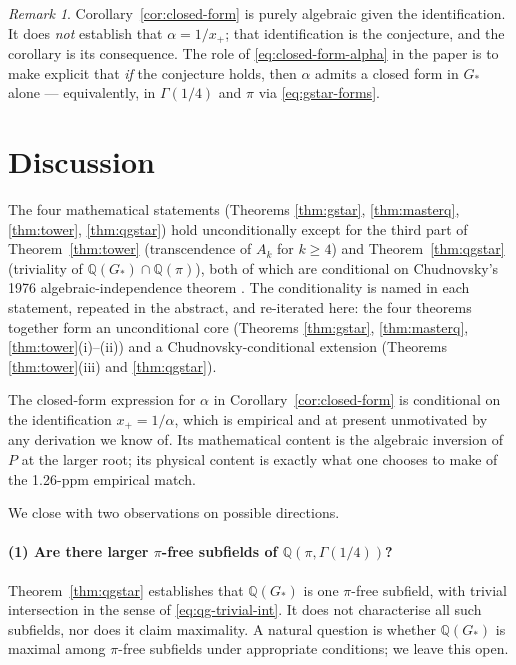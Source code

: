 \documentclass[11pt,reqno]{amsart}
\theoremstyle{plain}
\theoremstyle{definition}
\theoremstyle{remark}
\newtheorem{remark}[theorem]{Remark}
\numberwithin{equation}{section}
\newcommand{\Gstar}{G_{\!*}}
\begin{document}
\begin{remark}
Corollary~\ref{cor:closed-form} is purely algebraic given the
identification. It does \emph{not} establish that $\alpha = 1/x_{+}$;
that identification is the conjecture, and the corollary is its
consequence. The role of \eqref{eq:closed-form-alpha} in the paper is
to make explicit that \emph{if} the conjecture holds, then $\alpha$
admits a closed form in $\Gstar$ alone --- equivalently, in
$\Gamma(1/4)$ and $\pi$ via \eqref{eq:gstar-forms}.
\end{remark}

\section{Discussion}
\label{sec:discussion}

The four mathematical statements (Theorems \ref{thm:gstar},
\ref{thm:masterq}, \ref{thm:tower}, \ref{thm:qgstar}) hold
unconditionally except for the third part of Theorem~\ref{thm:tower}
(transcendence of $A_{k}$ for $k \geq 4$) and Theorem~\ref{thm:qgstar}
(triviality of $\mathbb{Q}(\Gstar) \cap \mathbb{Q}(\pi)$), both of
which are conditional on Chudnovsky's 1976 algebraic-independence
theorem \cite{chudnovsky1976}. The conditionality is named in each
statement, repeated in the abstract, and re-iterated here: the four
theorems together form an unconditional core (Theorems \ref{thm:gstar},
\ref{thm:masterq}, \ref{thm:tower}(i)--(ii)) and a Chudnovsky-conditional
extension (Theorems \ref{thm:tower}(iii) and \ref{thm:qgstar}).

The closed-form expression for $\alpha$ in
Corollary~\ref{cor:closed-form} is conditional on the identification
$x_{+} = 1/\alpha$, which is empirical and at present unmotivated by
any derivation we know of. Its mathematical content is the algebraic
inversion of $P$ at the larger root; its physical content is exactly
what one chooses to make of the 1.26-ppm empirical match.

We close with two observations on possible directions.

\paragraph{(1) Are there larger $\pi$-free subfields of $\mathbb{Q}(\pi, \Gamma(1/4))$?}
Theorem~\ref{thm:qgstar} establishes that $\mathbb{Q}(\Gstar)$ is one
$\pi$-free subfield, with trivial intersection in the sense of
\eqref{eq:qg-trivial-int}. It does not characterise all such
subfields, nor does it claim maximality. A natural question is
whether $\mathbb{Q}(\Gstar)$ is maximal among $\pi$-free subfields
under appropriate conditions; we leave this open.
\end{document}
